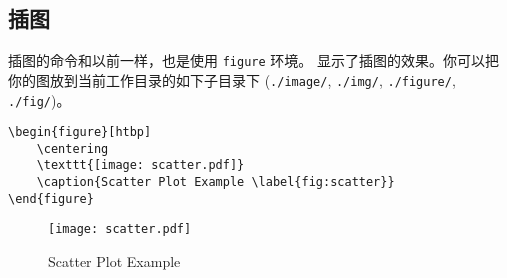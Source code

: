 \documentclass[lang=cn,11pt,numbers, a4paper]{elegantpaper}
\begin{document}
\subsection{插图}
插图的命令和以前一样，也是使用 \lstinline{figure} 环境。 显示了插图的效果。你可以把你的图放到当前工作目录的如下子目录下 (\lstinline{./image/}, \lstinline{./img/}, \lstinline{./figure/}, \lstinline{./fig/})。
\begin{lstlisting}
\begin{figure}[htbp]
	\centering
	\texttt{[image: scatter.pdf]}
	\caption{Scatter Plot Example \label{fig:scatter}}
\end{figure}
\end{lstlisting}
\begin{figure}[htbp]
	\centering
	\texttt{[image: scatter.pdf]}
	\caption{Scatter Plot Example \label{fig:scatter}}
\end{figure}
\end{document}
